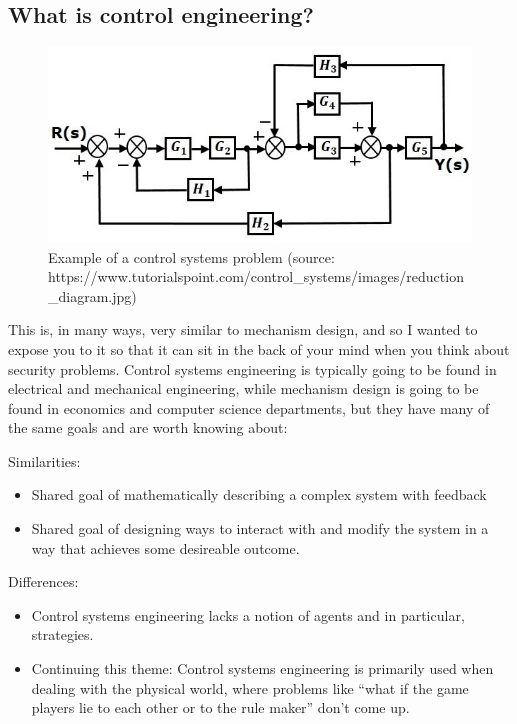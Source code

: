 \documentclass[11pt]{article}
\begin{document}
\subsection{What is control engineering?}

\begin{figure}[h!]
    \centering
    \includegraphics[width=5in]{controlsystems.jpeg}
    \caption{Example of a control systems problem (source: https://www.tutorialspoint.com/control\_systems/images/reduction\_diagram.jpg)}
\end{figure}

This is, in many ways, very similar to mechanism design, and so I wanted to expose you to it so that it can sit in the back of your mind when you think about security problems. 
Control systems engineering is typically going to be found in electrical and mechanical engineering, while mechanism design is going to be found in economics and computer science departments, but they have many of the same goals and are worth knowing about:

Similarities:
\begin{itemize}
    \item Shared goal of mathematically describing a complex system with feedback
    \item Shared goal of designing ways to interact with and modify the system in a way that achieves some desireable outcome.
\end{itemize}

Differences:
\begin{itemize}
    \item Control systems engineering lacks a notion of agents and in particular, strategies.
    \item Continuing this theme: Control systems engineering is primarily used when dealing with the physical world, where problems like ``what if the game players lie to each other or to the rule maker'' don't come up. 
\end{itemize}
\end{document}
